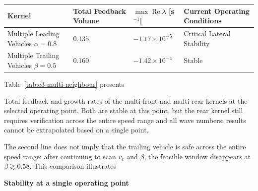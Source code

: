 \documentclass[11pt,a4paper,openany]{book}
\numberwithin{equation}{chapter}
\numberwithin{figure}{chapter}
\numberwithin{table}{chapter}
\newcommand{\tabletext}[2]{%
  \par\smallskip\noindent
  Table~\ref{#1} presents #2
\par\smallskip
}
\begin{document}
\begin{center}
\small
{}
\label{tab:e3-multi-neighbour}
\begin{tabular}{p{3.7cm}p{3.0cm}p{3.6cm}p{2.8cm}}
\toprule
\textbf{Kernel} & \textbf{Total Feedback Volume} & \textbf{$\max\operatorname{Re}\lambda$ [s$^{-1}$]} & \textbf{Current Operating Conditions} \\
\midrule







Multiple Leading Vehicles $\alpha=0.8$




& $0.135$ & $-1.17\times10^{-5}$ &




Critical Lateral Stability



\\







Multiple Trailing Vehicles $\beta=0.5$




& $0.160$ & $-1.42\times10^{-4}$ &




 Stable



\\
\bottomrule
\end{tabular}
\end{center}
\tabletext{tab:e3-multi-neighbour}{




Total feedback and growth rates of the multi-front and multi-rear kernels at the selected operating point. Both are stable at this point, but the rear kernel still requires verification across the entire speed range and all wave numbers; results cannot be extrapolated based on a single point.}





The second line does not imply that the trailing vehicle is safe across the entire speed range: after continuing to scan $v_e$ and $\beta$, the feasible window disappears at $\beta\gtrsim0.58$. This comparison illustrates




\textbf{Stability at a single operating point}
\end{document}
